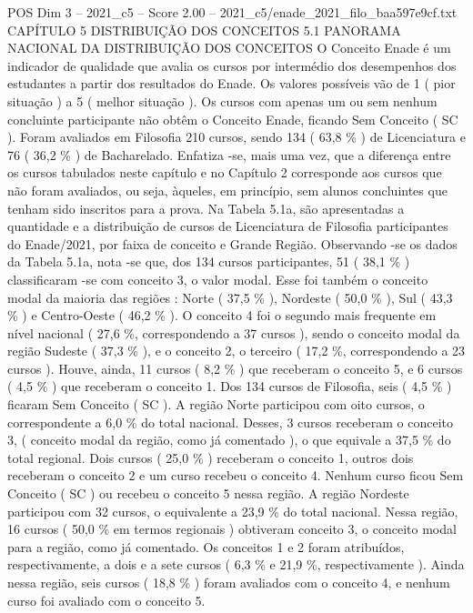 \begin{textsample}{POS Dim 3 – 2021\_c5 – Score 2.00 – 2021\_c5/enade\_2021\_filo\_baa597e9cf.txt}  \label{ex:f3_pos_082}
CAPÍTULO 5 DISTRIBUIÇÃO DOS CONCEITOS 5.1 PANORAMA NACIONAL DA DISTRIBUIÇÃO DOS CONCEITOS O Conceito Enade é um indicador de qualidade que avalia os cursos por intermédio dos desempenhos dos estudantes a partir dos resultados do Enade.
Os valores possíveis vão de 1 ( pior situação ) a 5 ( melhor situação ).
Os cursos com apenas um ou sem nenhum concluinte participante não obtêm o Conceito Enade, ficando Sem Conceito ( SC ).
Foram avaliados em Filosofia 210 cursos, sendo 134 ( 63,8 \% ) de Licenciatura e 76 ( 36,2 \% ) de Bacharelado.
Enfatiza -se, mais uma vez, que a diferença entre os cursos tabulados neste capítulo e no Capítulo 2 corresponde aos cursos que não foram avaliados, ou seja, àqueles, em princípio, sem alunos concluintes que tenham sido inscritos para a prova.
Na Tabela 5.1a, são apresentadas a quantidade e a distribuição de cursos de Licenciatura de Filosofia participantes do Enade/2021, por faixa de conceito e Grande Região.
Observando -se os dados da Tabela 5.1a, nota -se que, dos 134 cursos participantes, 51 ( 38,1 \% ) classificaram -se com conceito 3, o valor modal.
Esse foi também o conceito modal da maioria das regiões : Norte ( 37,5 \% ), Nordeste ( 50,0 \% ), Sul ( 43,3 \% ) e Centro-Oeste ( 46,2 \% ).
O conceito 4 foi o segundo mais frequente em nível nacional ( 27,6 \%, correspondendo a 37 cursos ), sendo o conceito modal da região Sudeste ( 37,3 \% ), e o conceito 2, o terceiro ( 17,2 \%, correspondendo a 23 cursos ).
Houve, ainda, 11 cursos ( 8,2 \% ) que receberam o conceito 5, e 6 cursos ( 4,5 \% ) que receberam o conceito 1.
Dos 134 cursos de Filosofia, seis ( 4,5 \% ) ficaram Sem Conceito ( SC ).
A região Norte participou com oito cursos, o correspondente a 6,0 \% do total nacional.
Desses, 3 cursos receberam o conceito 3, ( conceito modal da região, como já comentado ), o que equivale a 37,5 \% do total regional.
Dois cursos ( 25,0 \% ) receberam o conceito 1, outros dois receberam o conceito 2 e um curso recebeu o conceito 4.
Nenhum curso ficou Sem Conceito ( SC ) ou recebeu o conceito 5 nessa região.
A região Nordeste participou com 32 cursos, o equivalente a 23,9 \% do total nacional.
Nessa região, 16 cursos ( 50,0 \% em termos regionais ) obtiveram conceito 3, o conceito modal para a região, como já comentado.
Os conceitos 1 e 2 foram atribuídos, respectivamente, a dois e a sete cursos ( 6,3 \% e 21,9 \%, respectivamente ).
Ainda nessa região, seis cursos ( 18,8 \% ) foram avaliados com o conceito 4, e nenhum curso foi avaliado com o conceito 5.

\end{textsample}
